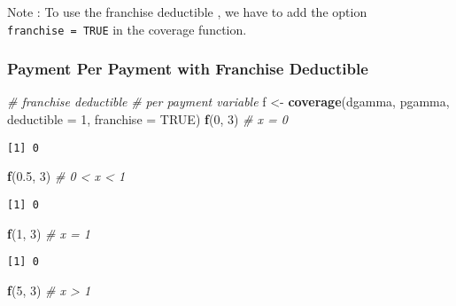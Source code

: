 \documentclass[]{book}
\newenvironment{Shaded}{\begin{snugshade}}{\end{snugshade}}
\newcommand{\KeywordTok}[1]{\textcolor[rgb]{0.13,0.29,0.53}{\textbf{#1}}}
\newcommand{\DataTypeTok}[1]{\textcolor[rgb]{0.13,0.29,0.53}{#1}}
\newcommand{\DecValTok}[1]{\textcolor[rgb]{0.00,0.00,0.81}{#1}}
\newcommand{\FloatTok}[1]{\textcolor[rgb]{0.00,0.00,0.81}{#1}}
\newcommand{\StringTok}[1]{\textcolor[rgb]{0.31,0.60,0.02}{#1}}
\newcommand{\CommentTok}[1]{\textcolor[rgb]{0.56,0.35,0.01}{\textit{#1}}}
\newcommand{\OtherTok}[1]{\textcolor[rgb]{0.56,0.35,0.01}{#1}}
\newcommand{\NormalTok}[1]{#1}
\theoremstyle{definition}
\theoremstyle{definition}
\theoremstyle{definition}
\theoremstyle{remark}
\begin{document}
Note : To use the franchise deductible , we have to add the option
\texttt{franchise\ =\ TRUE} in the coverage function.

\subsubsection{Payment Per Payment with Franchise
Deductible}\label{payment-per-payment-with-franchise-deductible}

\begin{Shaded}
\begin{Highlighting}[]
\CommentTok{# franchise deductible}
\CommentTok{# per payment variable}
\NormalTok{f <-}\StringTok{ }\KeywordTok{coverage}\NormalTok{(dgamma, pgamma, }\DataTypeTok{deductible =} \DecValTok{1}\NormalTok{, }\DataTypeTok{franchise =} \OtherTok{TRUE}\NormalTok{)}
\KeywordTok{f}\NormalTok{(}\DecValTok{0}\NormalTok{, }\DecValTok{3}\NormalTok{)   }\CommentTok{# x = 0}
\end{Highlighting}
\end{Shaded}

\begin{verbatim}
[1] 0
\end{verbatim}

\begin{Shaded}
\begin{Highlighting}[]
\KeywordTok{f}\NormalTok{(}\FloatTok{0.5}\NormalTok{, }\DecValTok{3}\NormalTok{) }\CommentTok{# 0 < x < 1}
\end{Highlighting}
\end{Shaded}

\begin{verbatim}
[1] 0
\end{verbatim}

\begin{Shaded}
\begin{Highlighting}[]
\KeywordTok{f}\NormalTok{(}\DecValTok{1}\NormalTok{, }\DecValTok{3}\NormalTok{) }\CommentTok{# x = 1}
\end{Highlighting}
\end{Shaded}

\begin{verbatim}
[1] 0
\end{verbatim}

\begin{Shaded}
\begin{Highlighting}[]
\KeywordTok{f}\NormalTok{(}\DecValTok{5}\NormalTok{, }\DecValTok{3}\NormalTok{) }\CommentTok{# x > 1}
\end{Highlighting}
\end{Shaded}
\end{document}
